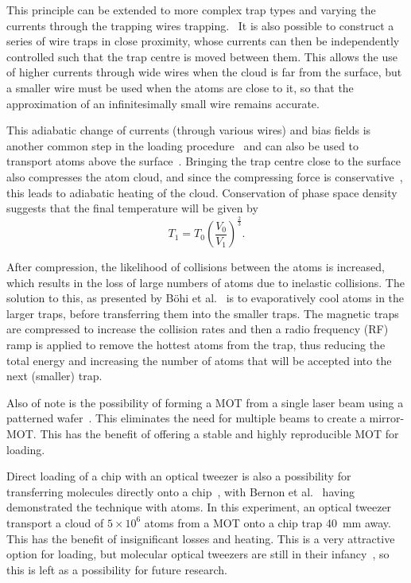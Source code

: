 This principle can be extended to more complex trap types and varying the
currents through the trapping wires trapping.~\cite{Folman2000} It is also
possible to construct a series of wire traps in close proximity, whose currents
can then be independently controlled such that the trap centre is moved between
them. This allows the use of higher currents through wide wires when the cloud
is far from the surface, but a smaller wire must be used when the atoms are
close to it, so that the approximation of an infinitesimally small wire remains
accurate.

This adiabatic change of currents (through various wires) and bias fields is
another common step in the loading procedure~\cite{Folman2000,2011Ac,
RevModPhys.79.235} and can also be used to transport atoms above the
surface~\cite{Reichel1999, Schwindt2005}. Bringing the trap centre close to the
surface also compresses the atom cloud, and since the compressing force is
conservative~\cite{Metcalf1999}, this leads to adiabatic heating of the cloud.
Conservation of phase space density suggests that the final temperature will be
given by~\cite{Metcalf1999}
%
\begin{equation}
   T_1 = T_0\left(\frac{V_0}{V_1}\right)^\frac{2}{3}.
\end{equation}

After compression, the likelihood of collisions between the atoms is increased,
which results in the loss of large numbers of atoms due to inelastic collisions.
The solution to this, as presented by B\"ohi et al.~\cite{Boehi2009} is to
evaporatively cool atoms in the larger traps, before transferring them into the
smaller traps. The magnetic traps are compressed to increase the collision
rates and then a radio frequency (RF) ramp is applied to remove the hottest
atoms from the trap, thus reducing the total energy and increasing the number of
atoms that will be accepted into the next (smaller) trap.~\cite{Foot2005,
Metcalf1999}

Also of note is the possibility of forming a MOT from a single laser beam using
a patterned wafer~\cite{Nshii2013}. This eliminates the need for multiple beams
to create a mirror-MOT. This has the benefit of offering a stable and highly
reproducible MOT for loading.

Direct loading of a chip with an optical tweezer is also a possibility for
transferring molecules directly onto a chip~\cite{Liueaar7797}, with Bernon et
al.~\cite{Bernon2013} having demonstrated the technique with atoms. In this
experiment, an optical tweezer transport a cloud of $5\times10^6$ \esRb{}
atoms from a MOT onto a chip trap \SI{40}{\milli\metre} away. This has the
benefit of insignificant losses and heating. This is a very attractive option
for loading, but molecular optical tweezers are still in their
infancy~\cite{Anderegg2019}, so this is left as a possibility for future
research.

